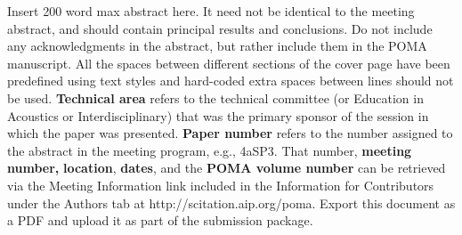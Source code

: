 \documentclass[11pt]{article}
\begin{document}
 \noindent
{\normalsize{Insert 200 word max abstract here. It need not be identical to the meeting abstract, and should contain principal results and conclusions. Do not include any acknowledgments in the abstract, but rather include them in the POMA manuscript.  All the spaces between different sections of the cover page have been predefined using text styles and hard-coded extra spaces between lines should not be used. \textbf{Technical area} refers to the technical committee (or Education in Acoustics or Interdisciplinary) that was the primary sponsor of the session in which the paper was presented. \textbf{Paper number} refers to the number assigned to the abstract in the meeting program, e.g., 4aSP3. That number, \textbf{meeting number,} \textbf{location}, \textbf{dates}, and the \textbf{POMA volume number} can be retrieved via the Meeting Information link included in the Information for Contributors under the Authors tab at http://scitation.aip.org/poma. Export this document as a PDF and upload it as part of the submission package. }}

 \vspace{5pt}
\end{document}
